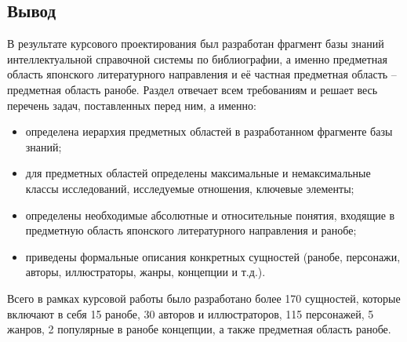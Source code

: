\subsection{Вывод}
В результате курсового проектирования был разработан фрагмент базы знаний интеллектуальной справочной системы по библиографии, а именно предметная область японского литературного направления и её частная предметная область -- предметная область ранобе. Раздел отвечает всем требованиям и решает весь перечень задач, поставленных перед ним, а именно:
\begin{itemize}
    \item определена иерархия предметных областей в разработанном фрагменте базы знаний;
    \item для предметных областей определены максимальные и немаксимальные классы исследований, исследуемые отношения, ключевые элементы;
    \item определены необходимые абсолютные и относительные понятия, входящие в предметную область японского литературного направления и ранобе;
    \item приведены формальные описания конкретных сущностей (ранобе, персонажи, авторы, иллюстраторы, жанры, концепции и т.д.).
\end{itemize}

Всего в рамках курсовой работы было разработано более 170 сущностей, которые включают в себя 15 ранобе, 30 авторов и иллюстраторов, 115 персонажей, 5 жанров, 2 популярные в ранобе концепции, а также предметная область ранобе.
